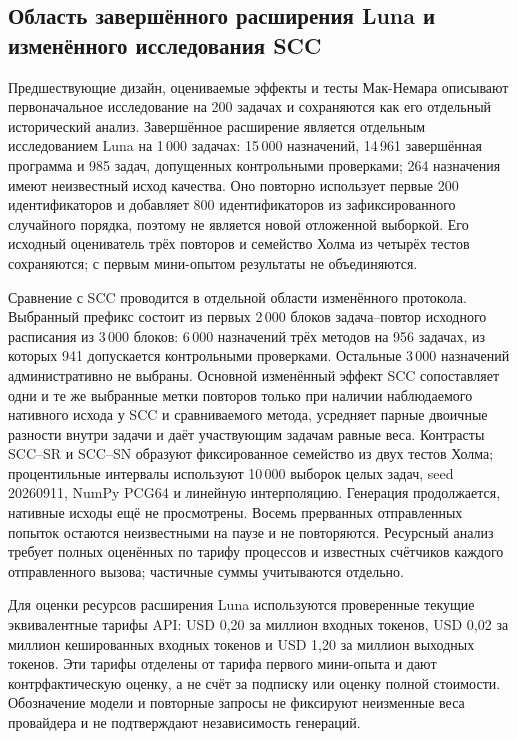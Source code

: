 \subsection{Область завершённого расширения Luna и изменённого исследования SCC}
Предшествующие дизайн, оцениваемые эффекты и тесты Мак-Немара описывают первоначальное исследование на 200 задачах и сохраняются как его отдельный исторический анализ. Завершённое расширение является отдельным исследованием Luna на 1\,000 задачах: 15\,000 назначений, 14\,961 завершённая программа и 985 задач, допущенных контрольными проверками; 264 назначения имеют неизвестный исход качества. Оно повторно использует первые 200 идентификаторов и добавляет 800 идентификаторов из зафиксированного случайного порядка, поэтому не является новой отложенной выборкой. Его исходный оцениватель трёх повторов и семейство Холма из четырёх тестов сохраняются; с первым мини-опытом результаты не объединяются.

Сравнение с SCC проводится в отдельной области изменённого протокола. Выбранный префикс состоит из первых 2\,000 блоков задача--повтор исходного расписания из 3\,000 блоков: 6\,000 назначений трёх методов на 956 задачах, из которых 941 допускается контрольными проверками. Остальные 3\,000 назначений административно не выбраны. Основной изменённый эффект SCC сопоставляет одни и те же выбранные метки повторов только при наличии наблюдаемого нативного исхода у SCC и сравниваемого метода, усредняет парные двоичные разности внутри задачи и даёт участвующим задачам равные веса. Контрасты SCC--SR и SCC--SN образуют фиксированное семейство из двух тестов Холма; процентильные интервалы используют 10\,000 выборок целых задач, seed 20260911, NumPy PCG64 и линейную интерполяцию. Генерация продолжается, нативные исходы ещё не просмотрены. Восемь прерванных отправленных попыток остаются неизвестными на паузе и не повторяются. Ресурсный анализ требует полных оценённых по тарифу процессов и известных счётчиков каждого отправленного вызова; частичные суммы учитываются отдельно.

Для оценки ресурсов расширения Luna используются проверенные текущие эквивалентные тарифы API: USD 0,20 за миллион входных токенов, USD 0,02 за миллион кешированных входных токенов и USD 1,20 за миллион выходных токенов. Эти тарифы отделены от тарифа первого мини-опыта и дают контрфактическую оценку, а не счёт за подписку или оценку полной стоимости. Обозначение модели и повторные запросы не фиксируют неизменные веса провайдера и не подтверждают независимость генераций.

